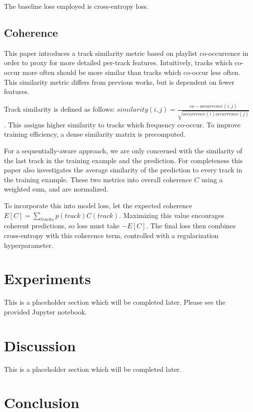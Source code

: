 \documentclass[conference]{IEEEtran}
\begin{document}
The baseline loss employed is cross-entropy loss.

\subsection{Coherence}

This paper introduces a track similarity metric based on playlist co-occurrence in order to proxy for more detailed per-track features. Intuitively, tracks which co-occur more often should be more similar than tracks which co-occur less often. This similarity metric differs from previous works, but is dependent on fewer features.

Track similarity is defined as follows: $similarity(i, j) = \frac{co-occurrence(i, j)}{\sqrt{occurrence(i)occurrence(j)}}$. This assigns higher similarity to tracks which frequency co-occur. To improve training efficiency, a dense similarity matrix is precomputed.

For a sequentially-aware approach, we are only concerned with the similarity of the last track in the training example and the prediction. For completeness this paper also investigates the average similarity of the prediction to every track in the training example. These two metrics into overall coherence $C$ using a weighted sum, and are normalized.

To incorporate this into model loss, let the expected coherence $E[C] = \sum_{tracks}p(track)C(track)$. Maximizing this value encourages coherent predictions, so loss must take $-E[C]$. The final loss then combines cross-entropy with this coherence term, controlled with a regularization hyperparameter.

\section{Experiments}

This is a placeholder section which will be completed later. Please see the provided Jupyter notebook.

\section{Discussion}

This is a placeholder section which will be completed later.

\section{Conclusion}
\end{document}
